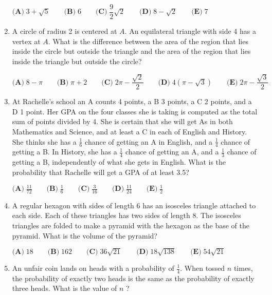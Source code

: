 \documentclass{article}
\begin{document}
\begin{enumerate}[label=\arabic*., itemsep=0.5em]
\(\textbf{(A)}\; 3+\sqrt{5} \qquad\textbf{(B)}\; 6 \qquad\textbf{(C)}\; \dfrac{9}{2}\sqrt{2} \qquad\textbf{(D)}\; 8-\sqrt{2} \qquad\textbf{(E)}\; 7\)\par \vspace{0.5em}\item A circle of radius 2 is centered at \(A\). An equilateral triangle with side 4 has a vertex at \(A\). What is the difference between the area of the region that lies inside the circle but outside the triangle and the area of the region that lies inside the triangle but outside the circle?

\(\textbf{(A)}\; 8-\pi \qquad\textbf{(B)}\; \pi+2 \qquad\textbf{(C)}\; 2\pi-\dfrac{\sqrt{2}}{2} \qquad\textbf{(D)}\; 4(\pi-\sqrt{3}) \qquad\textbf{(E)}\; 2\pi-\dfrac{\sqrt{3}}{2}\)\par \vspace{0.5em}\item At Rachelle's school an A counts 4 points, a B 3 points, a C 2 points, and a D 1 point. Her GPA on the four classes she is taking is computed as the total sum of points divided by 4. She is certain that she will get As in both Mathematics and Science, and at least a C in each of English and History. She thinks she has a \(\tfrac{1}{6}\) chance of getting an A in English, and a \(\tfrac{1}{4}\) chance of getting a B. In History, she has a \(\tfrac{1}{4}\) chance of getting an A, and a \(\tfrac{1}{3}\) chance of getting a B, independently of what she gets in English. What is the probability that Rachelle will get a GPA of at least 3.5?

\(\textbf{(A)}\; \frac{11}{72} \qquad\textbf{(B)}\; \frac{1}{6} \qquad\textbf{(C)}\; \frac{3}{16} \qquad\textbf{(D)}\; \frac{11}{24} \qquad\textbf{(E)}\; \frac{1}{2}\)\par \vspace{0.5em}\item A regular hexagon with sides of length 6 has an isosceles triangle attached to each side. Each of these triangles has two sides of length 8. The isosceles triangles are folded to make a pyramid with the hexagon as the base of the pyramid. What is the volume of the pyramid?

\(\textbf{(A)}\; 18 \qquad\textbf{(B)}\; 162 \qquad\textbf{(C)}\; 36\sqrt{21} \qquad\textbf{(D)}\; 18\sqrt{138} \qquad\textbf{(E)}\; 54\sqrt{21}\)\par \vspace{0.5em}\item An unfair coin lands on heads with a probability of \(\tfrac{1}{4}\). When tossed \(n\) times, the probability of exactly two heads is the same as the probability of exactly three heads. What is the value of \(n\) ?


\end{enumerate}
\end{document}
